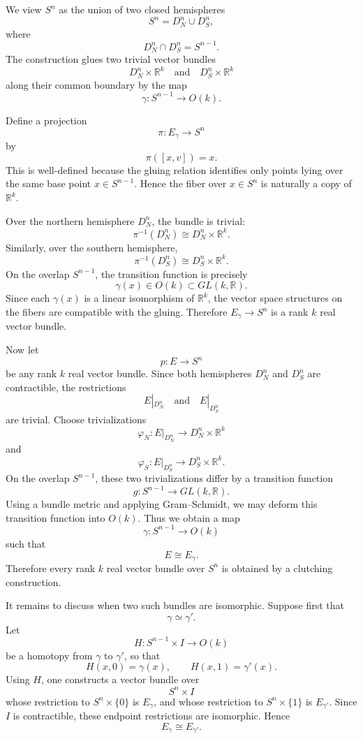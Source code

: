 \documentclass[12pt,a4paper]{article}
\theoremstyle{notespace}
\begin{document}
We view \(S^n\) as the union of two closed hemispheres
\[
S^n=D_N^n\cup D_S^n,
\]
where
\[
D_N^n\cap D_S^n=S^{n-1}.
\]
The construction glues two trivial vector bundles
\[
D_N^n\times \mathbb{R}^k
\quad\text{and}\quad
D_S^n\times \mathbb{R}^k
\]
along their common boundary by the map
\[
\gamma:S^{n-1}\to O(k).
\]

Define a projection
\[
\pi:E_{\gamma}\longrightarrow S^n
\]
by
\[
\pi([x,v])=x.
\]
This is well-defined because the gluing relation identifies only points lying over the same base point \(x\in S^{n-1}\). Hence the fiber over \(x\in S^n\) is naturally a copy of \(\mathbb{R}^k\).

Over the northern hemisphere \(D_N^n\), the bundle is trivial:
\[
\pi^{-1}(D_N^n)\cong D_N^n\times \mathbb{R}^k.
\]
Similarly, over the southern hemisphere,
\[
\pi^{-1}(D_S^n)\cong D_S^n\times \mathbb{R}^k.
\]
On the overlap \(S^{n-1}\), the transition function is precisely
\[
\gamma(x)\in O(k)\subset GL(k,\mathbb{R}).
\]
Since each \(\gamma(x)\) is a linear isomorphism of \(\mathbb{R}^k\), the vector space structures on the fibers are compatible with the gluing. Therefore \(E_{\gamma}\to S^n\) is a rank \(k\) real vector bundle.

Now let
\[
p:E\to S^n
\]
be any rank \(k\) real vector bundle. Since both hemispheres \(D_N^n\) and \(D_S^n\) are contractible, the restrictions
\[
E|_{D_N^n}
\quad\text{and}\quad
E|_{D_S^n}
\]
are trivial. Choose trivializations
\[
\varphi_N:E|_{D_N^n}\longrightarrow D_N^n\times \mathbb{R}^k
\]
and
\[
\varphi_S:E|_{D_S^n}\longrightarrow D_S^n\times \mathbb{R}^k.
\]
On the overlap \(S^{n-1}\), these two trivializations differ by a transition function
\[
g:S^{n-1}\longrightarrow GL(k,\mathbb{R}).
\]
Using a bundle metric and applying Gram--Schmidt, we may deform this transition function into \(O(k)\). Thus we obtain a map
\[
\gamma:S^{n-1}\to O(k)
\]
such that
\[
E\cong E_{\gamma}.
\]
Therefore every rank \(k\) real vector bundle over \(S^n\) is obtained by a clutching construction.

It remains to discuss when two such bundles are isomorphic. Suppose first that
\[
\gamma\simeq \gamma'.
\]
Let
\[
H:S^{n-1}\times I\longrightarrow O(k)
\]
be a homotopy from \(\gamma\) to \(\gamma'\), so that
\[
H(x,0)=\gamma(x),
\qquad
H(x,1)=\gamma'(x).
\]
Using \(H\), one constructs a vector bundle over
\[
S^n\times I
\]
whose restriction to \(S^n\times\{0\}\) is \(E_{\gamma}\), and whose restriction to \(S^n\times\{1\}\) is \(E_{\gamma'}\). Since \(I\) is contractible, these endpoint restrictions are isomorphic. Hence
\[
E_{\gamma}\cong E_{\gamma'}.
\]
\end{document}
